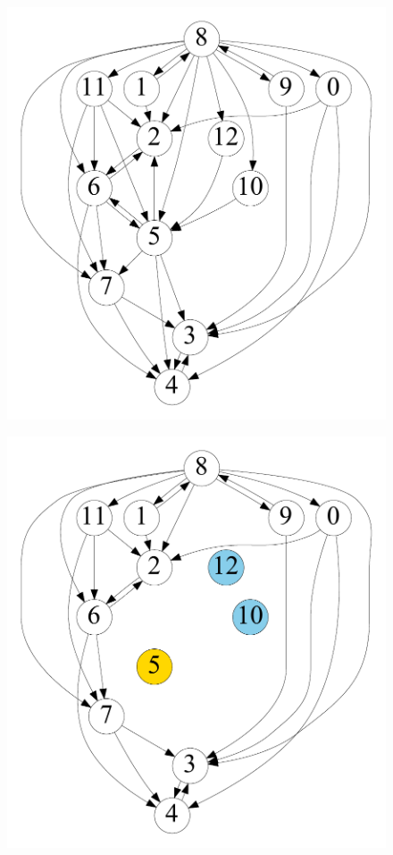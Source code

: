 \begin{figure}[t]
    \centering
    \begin{minipage}[b]{0.19\linewidth}
        \captionsetup{type=figure}
        \centering
        	{\includegraphics[width=\textwidth]{./alg_fig/simple-g0}}
    \end{minipage}
    \begin{minipage}[b]{0.19\linewidth}
        \centering
        {\includegraphics[width=\textwidth]{./alg_fig/simple-g2}}

\end{minipage}
\end{figure}
